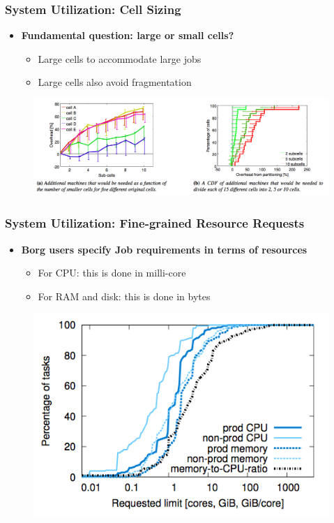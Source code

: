 \begin{frame}
\frametitle{System Utilization: Cell Sizing}
\begin{itemize}
	\item {\bf Fundamental question: large or small cells?}
	\begin{itemize}
		\item Large cells to accommodate large jobs
		\item Large cells also avoid fragmentation
	\end{itemize}
\end{itemize}
\begin{figure}[h]
  \centering
  \includegraphics[scale=0.3]{./figures/borg_exp_size}
  \label{fig:borg_exp_size}
\end{figure}
\end{frame}

\begin{frame}
\frametitle{System Utilization: Fine-grained Resource Requests}
\begin{itemize}
	\item {\bf Borg users specify Job requirements in terms of resources}
	\begin{itemize}
		\item For CPU: this is done in milli-core
		\item For RAM and disk: this is done in bytes
	\end{itemize}
\end{itemize}
\begin{figure}[h]
  \centering
  \includegraphics[scale=0.4]{./figures/borg_exp_fine}
  \label{fig:borg_exp_size}
\end{figure}
\end{frame}

